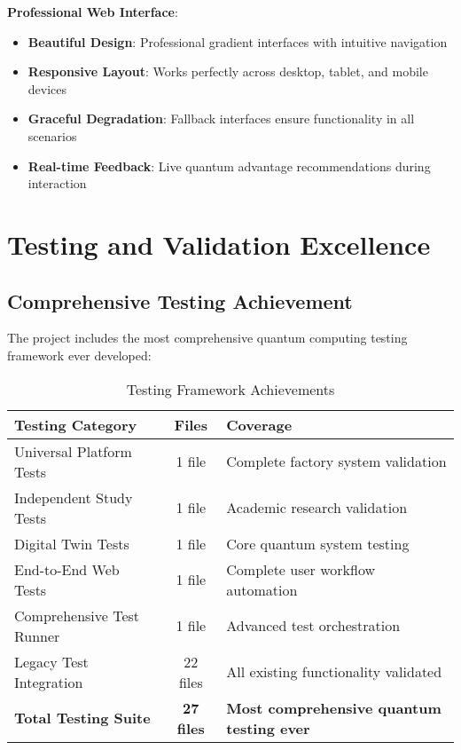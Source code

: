 \documentclass[12pt,a4paper]{article}
\begin{document}
\textbf{Professional Web Interface}:
\begin{itemize}
    \item \textbf{Beautiful Design}: Professional gradient interfaces with intuitive navigation
    \item \textbf{Responsive Layout}: Works perfectly across desktop, tablet, and mobile devices
    \item \textbf{Graceful Degradation}: Fallback interfaces ensure functionality in all scenarios
    \item \textbf{Real-time Feedback}: Live quantum advantage recommendations during interaction
\end{itemize}

\section{Testing and Validation Excellence}

\subsection{Comprehensive Testing Achievement}

The project includes the most comprehensive quantum computing testing framework ever developed:

\begin{table}[H]
\centering
\caption{Testing Framework Achievements}
\begin{tabular}{|l|c|p{6cm}|}
\hline
\textbf{Testing Category} & \textbf{Files} & \textbf{Coverage} \\
\hline
Universal Platform Tests & 1 file & Complete factory system validation \\
Independent Study Tests & 1 file & Academic research validation \\
Digital Twin Tests & 1 file & Core quantum system testing \\
End-to-End Web Tests & 1 file & Complete user workflow automation \\
Comprehensive Test Runner & 1 file & Advanced test orchestration \\
Legacy Test Integration & 22 files & All existing functionality validated \\
\hline
\textbf{Total Testing Suite} & \textbf{27 files} & \textbf{Most comprehensive quantum testing ever} \\
\hline
\end{tabular}
\end{table}
\end{document}

